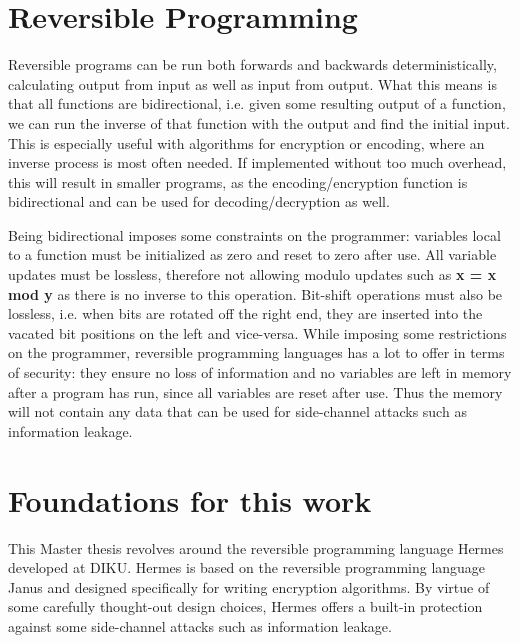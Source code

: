 \section{Reversible Programming}
Reversible programs can be run both forwards and backwards deterministically, calculating output from input as well as input from output.
What this means is that all functions are bidirectional, i.e. given some resulting output of a function, we can run the inverse of that function with the output and find the initial input.
This is especially useful with algorithms for encryption or encoding, where an inverse process is most often needed.
If implemented without too much overhead, this will result in smaller programs, as the encoding/encryption function is bidirectional and can be used for decoding/decryption as well.

Being bidirectional imposes some constraints on the programmer: variables local to a function must be initialized as zero and reset to zero after use.
All variable updates must be lossless, therefore not allowing modulo updates such as \textbf{x = x mod y} as there is no inverse to this operation.
Bit-shift operations must also be lossless, i.e. when bits are rotated off the right end, they are inserted into the vacated bit positions on the left and vice-versa. While imposing some restrictions on the programmer, reversible programming languages has a lot to offer in terms of security: they ensure no loss of information and no variables are left in memory after a program has run, since all variables are reset after use. Thus the memory will not contain any data that can be used for side-channel attacks such as information leakage.

\section{Foundations for this work}
This Master thesis revolves around the reversible programming language Hermes developed at DIKU.
Hermes is based on the reversible programming language Janus and designed specifically for writing encryption algorithms\cite{MogensenHermes}.
By virtue of some carefully thought-out design choices, Hermes offers a built-in protection against some side-channel attacks such as information leakage.

